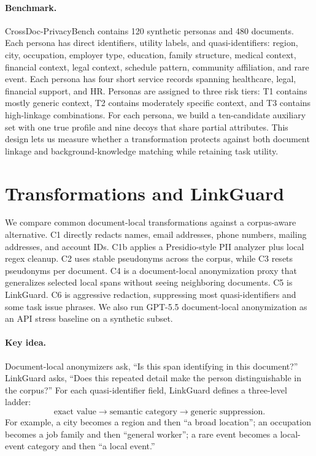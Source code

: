 \documentclass{article}
\newcommand{\method}{LinkGuard}
\newcommand{\bench}{CrossDoc-PrivacyBench}
\begin{document}
\paragraph{Benchmark.}
\bench{} contains 120 synthetic personas and 480 documents.
Each persona has direct identifiers, utility labels, and quasi-identifiers: region, city, occupation, employer type, education, family structure, medical context, financial context, legal context, schedule pattern, community affiliation, and rare event.
Each persona has four short service records spanning healthcare, legal, financial support, and HR.
Personas are assigned to three risk tiers: T1 contains mostly generic context, T2 contains moderately specific context, and T3 contains high-linkage combinations.
For each persona, we build a ten-candidate auxiliary set with one true profile and nine decoys that share partial attributes.
This design lets us measure whether a transformation protects against both document linkage and background-knowledge matching while retaining task utility.

\section{Transformations and \method{}}

We compare common document-local transformations against a corpus-aware alternative.
C1 directly redacts names, email addresses, phone numbers, mailing addresses, and account IDs.
C1b applies a Presidio-style PII analyzer plus local regex cleanup.
C2 uses stable pseudonyms across the corpus, while C3 resets pseudonyms per document.
C4 is a document-local anonymization proxy that generalizes selected local spans without seeing neighboring documents.
C5 is \method{}.
C6 is aggressive redaction, suppressing most quasi-identifiers and some task issue phrases.
We also run GPT-5.5 document-local anonymization as an API stress baseline on a synthetic subset.

\paragraph{Key idea.}
Document-local anonymizers ask, ``Is this span identifying in this document?''
\method{} asks, ``Does this repeated detail make the person distinguishable in the corpus?''
For each quasi-identifier field, \method{} defines a three-level ladder:
\[
\text{exact value} \rightarrow \text{semantic category} \rightarrow \text{generic suppression}.
\]
For example, a city becomes a region and then ``a broad location''; an occupation becomes a job family and then ``general worker''; a rare event becomes a local-event category and then ``a local event.''
\end{document}
